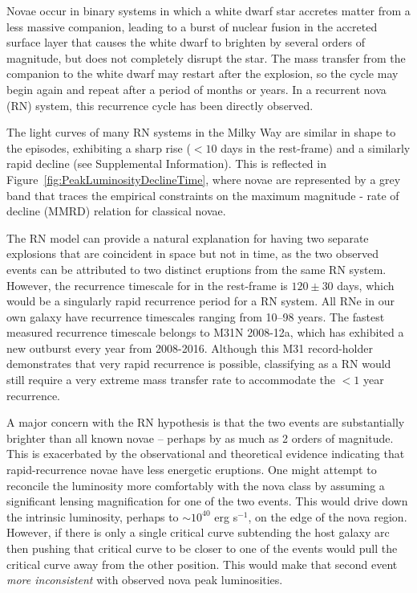 Novae occur in binary systems in which a white dwarf star accretes
matter from a less massive companion, leading to a burst of nuclear
fusion in the accreted surface layer that causes the white dwarf to
brighten by several orders of magnitude, but does not completely
disrupt the star. The mass transfer from the companion to the white
dwarf may restart after the explosion, so the cycle may begin again
and repeat after a period of months or years.  In a recurrent nova
(RN) system, this recurrence cycle has been directly observed.

The light curves of many RN systems in the Milky Way are similar in
shape to the \spock episodes, exhibiting a sharp rise ($<10$ days in
the rest-frame) and a similarly rapid decline (see Supplemental
Information).  This is reflected in
Figure~\ref{fig:PeakLuminosityDeclineTime}, where novae are
represented by a grey band that traces the empirical constraints on
the maximum magnitude - rate of decline (MMRD) relation for classical
novae\cite{DellaValle:1995, Downes:2000, Shafter:2011,
  Kasliwal:2011a}.

The RN model can provide a natural explanation for having two separate
explosions that are coincident in space but not in time, as the two
observed \spock events can be attributed to two distinct eruptions
from the same RN system.  However, the recurrence timescale for \spock
in the rest-frame is $120\pm30$ days, which would be a singularly
rapid recurrence period for a RN system.  All RNe in our own galaxy
have recurrence timescales ranging from 10--98 years\cite{Schaefer:2010}.  The fastest measured recurrence timescale
belongs to M31N 2008-12a, which has exhibited a new outburst every
year from 2008-2016\cite{Tang:2014,Darnley:2014,Darnley:2015,Henze:2015,Henze:2015a,Darnley:2016}. Although
this M31 record-holder demonstrates that very rapid recurrence is
possible, classifying \spock as a RN would still require a very
extreme mass transfer rate to accommodate the $<1$ year recurrence.

A major concern with the RN hypothesis is that the two \spock events
are substantially brighter than all known novae -- perhaps by as much
as 2 orders of magnitude.  This is exacerbated by the observational
and theoretical evidence indicating that rapid-recurrence novae have
less energetic eruptions\cite{Yaron:2005}.  One might
attempt to reconcile the \spock luminosity more comfortably with the
nova class by assuming a significant lensing magnification for one of
the two events. This would drive down the intrinsic luminosity,
perhaps to $\sim10^{40}$ erg s$^{-1}$, on the edge of the nova region.
However, if there is only a single critical curve subtending the
\spock host galaxy arc then pushing that critical curve to be closer
to one of the \spock events would pull the critical curve away from
the other \spock position. This would make that second event {\it more
  inconsistent} with observed nova peak luminosities.

